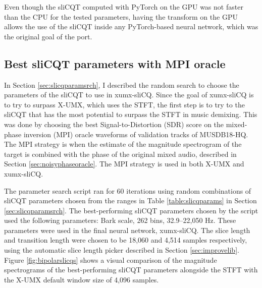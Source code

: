 \documentclass[report.tex]{subfiles}
\begin{document}
Even though the sliCQT computed with PyTorch on the GPU was not faster than the CPU for the tested parameters, having the transform on the GPU allows the use of the sliCQT inside any PyTorch-based neural network, which was the original goal of the port.

\subsection{Best sliCQT parameters with MPI oracle}
\label{sec:slicqparamresults}

In Section \ref{sec:slicqparamsrch}, I described the random search to choose the parameters of the sliCQT to use in xumx-sliCQ. Since the goal of xumx-sliCQ is to try to surpass X-UMX, which uses the STFT, the first step is to try to the sliCQT that has the most potential to surpass the STFT in music demixing. This was done by choosing the best Signal-to-Distortion (SDR) score on the mixed-phase inversion (MPI) oracle waveforms of validation tracks of MUSDB18-HQ. The MPI strategy is when the estimate of the magnitude spectrogram of the target is combined with the phase of the original mixed audio, described in Section \ref{sec:noisyphaseoracle}. The MPI strategy is used in both X-UMX and xumx-sliCQ.

The parameter search script ran for 60 iterations using random combinations of sliCQT parameters chosen from the ranges in Table \ref{table:slicqparams} in Section \ref{sec:slicqparamsrch}. The best-performing sliCQT parameters chosen by the script used the following parameters: Bark scale, 262 bins, 32.9--22,050 Hz. These parameters were used in the final neural network, xumx-sliCQ. The slice length and transition length were chosen to be 18,060 and 4,514 samples respectively, using the automatic slice length picker described in Section \ref{sec:improvelib}. Figure \ref{fig:bipolarslicqs} shows a visual comparison of the magnitude spectrograms of the best-performing sliCQT parameters alongside the STFT with the X-UMX default window size of 4,096 samples.
\end{document}
